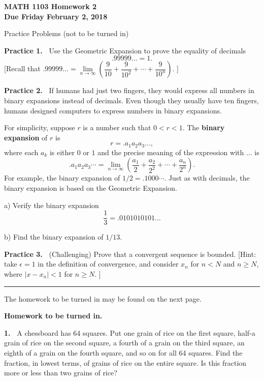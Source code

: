 \documentclass[12pt]{article}
\newcommand{\ep}{\epsilon}
\theoremstyle{definition}
\theoremstyle{remark}
\theoremstyle{definition}
\newenvironment{Solution}{\noindent\textbf{Solution.}}{}
\begin{document}
  

{\bf MATH 1103 Homework 2}\\
{\bf Due Friday February 2, 2018}


Practice Problems (not to be turned in)

\vskip5pt
{\bf Practice 1.\ } Use the Geometric Expansion to prove the equality of decimals
\[.99999\dots=1.\]
[Recall that 
$.99999\dots=\lim\limits_{n\to\infty}\left(\dfrac{9}{10}+\dfrac{9}{10^2}+\cdots+\dfrac{9}{10^n}\right).$
]

{\bf Practice 2.\ }   If humans  had just two fingers, they would express all numbers in binary expansions instead of decimals. Even though they usually have ten fingers,  humans designed computers to express numbers in binary expansions. 

For simplicity, suppose $r$ is a number such that $0<r<1$.
The {\bf binary expansion} of $r$ is 
\[r=.a_1a_2a_3\dots, \]
where each $a_k$ is either $0$ or $1$ and the precise meaning of the expression with $\dots$ is 
\[.a_1a_2a_3\cdots
=\lim_{n\to\infty} \left(\frac{a_1}{2}+\frac{a_2}{2^2}+\cdots+\frac{a_n}{2^n}\right).
\]
For example, the binary expansion of $1/2=.1000\cdots$. 
Just as with decimals, the binary expansion is based on the Geometric Expansion. 

a) Verify the binary expansion
\[\frac{1}{3}= .0101010101\dots
\]

b) Find the binary expansion of $1/13$.


{\bf Practice 3.\ } (Challenging) Prove that a convergent sequence is bounded. 
[Hint: take $\ep=1$ in the definition of convergence, and consider $x_n$ for $n< N$ and $n\geq N$, where $|x-x_n |<1$ for $n\geq N$. ]

 \rule{\textwidth}{1pt}
The homework to be turned in may be found on the next page.
\newpage

{\bf Homework to be turned in.}

{\bf 1.\ } A chessboard has 64 squares. Put one grain of rice on the first square, half-a grain of rice on the second square, a fourth of a grain on the third square, an eighth of a grain on the fourth square, and so on for all 64 squares. 
Find the fraction, in lowest terms, of grains of rice on the entire square.  Is this fraction more or less than two grains of rice?
\end{document}
